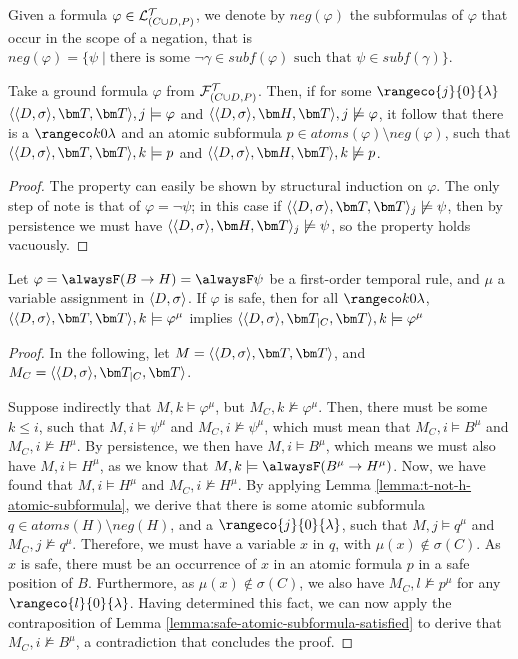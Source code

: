 \begin{definition}
  Given a formula $\varphi \in \mathcal{L}_{(C \cup D,P)}^\mathcal{T}$, we denote by $neg(\varphi)$
  the subformulas of $\varphi$ that occur in the scope of a negation,
  that is
  $neg(\varphi) = \{ \psi \mid \text{there is some } \lnot \gamma \in
  subf(\varphi) \text{ such that } \psi \in subf(\gamma) \}$.
\end{definition}

\begin{lemma}\label{lemma:t-not-h-atomic-subformula}
  Take a ground formula $\varphi$ from $\mathcal{F}_{(C \cup D,P)}^\mathcal{T}$. Then, if for some
  $\rangeco{j}{0}{\lambda}$\\ $\qttandt,j \models \varphi$ and
  $\qthandt,j \not\models \varphi$, it follow that there is a
  $\kinlambda$ and an atomic subformula
  $p \in atoms(\varphi) \setminus neg(\varphi)$, such that
  $\qttandt,k \models p$ and $\qthandt,k \not\models p$.
\end{lemma}
\begin{proof}
  The property can easily be shown by structural induction on
  $\varphi$. The only step of note is that of $\varphi = \neg \psi$;
  in this case if $\qttandt_j \not\models \psi$, then by
  persistence we must have $\qthandt_j \not\models \psi$, so the
  property holds vacuously.
\end{proof}



\begin{lemma}
  Let $\varphi=\alwaysF (B \rightarrow H)=\alwaysF \psi$ be a
  first-order temporal rule, and $\mu$ a variable assignment in
  $\langle D, \sigma \rangle$. If $\varphi$ is safe, then for all $\kinlambda$,
  $\qttandt,k \models \varphi^\mu$ implies
  $\qttcandt,k \models \varphi^\mu$
\end{lemma}
\begin{proof}
  In the following, let $M=\qttandt$, and $M_C=\qttcandt$.

  Suppose indirectly that $M,k \models \varphi^\mu$, but
  $M_C,k \not \models \varphi^\mu$. Then, there must be some
  $k\leq i$, such that $M,i \models \psi^\mu$ and
  $M_C,i \not \models \psi^\mu$, which must mean that
  $M_C,i \models B^\mu$ and $M_C,i \not \models H^\mu$. By
  persistence, we then have $M,i \models B^\mu$, which means we must
  also have $M,i \models H^\mu$, as we know that
  $M,k \models \alwaysF(B^\mu \rightarrow H^\mu)$. Now, we have found
  that $M,i \models H^\mu$ and $M_C,i \not \models H^\mu$. By applying
  Lemma \ref{lemma:t-not-h-atomic-subformula}, we derive that there is
  some atomic subformula $q \in atoms(H) \setminus neg(H)$, and a
  $\rangeco{j}{0}{\lambda}$, such that $M,j \models q^\mu$ and
  $M_C,j \not \models q^\mu$. Therefore, we must have a variable $x$
  in $q$, with $\mu(x) \not \in \sigma(C)$. As $x$ is safe, there must
  be an occurrence of $x$ in an atomic formula $p$ in a safe position
  of $B$. Furthermore, as $\mu(x) \not \in \sigma(C)$, we also have
  $M_C,l \not \models p^\mu$ for any $\rangeco{l}{0}{\lambda}$. Having
  determined this fact, we can now apply the contraposition of Lemma
  \ref{lemma:safe-atomic-subformula-satisfied} to derive that
  $M_C,i \not \models B^\mu$, a contradiction that concludes the
  proof.
\end{proof}

